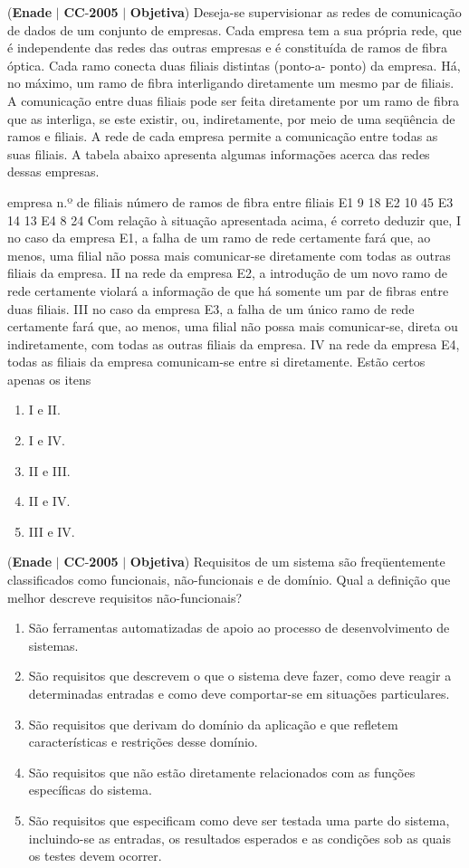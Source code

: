 \documentclass{exam}
\begin{document}
\begin{questions}
\question (\textbf{Enade} $|$ \textbf{CC}-\textbf{2005} $|$ \textbf{Objetiva})
Deseja-se supervisionar as redes de comunicação
de dados de um conjunto de empresas. Cada empresa
tem a sua própria rede, que é independente das redes
das outras empresas e é constituída de ramos de fibra
óptica. Cada ramo conecta duas filiais distintas (ponto-a-
ponto) da empresa. Há, no máximo, um ramo de fibra
interligando diretamente um mesmo par de filiais.
A comunicação entre duas filiais pode ser feita
diretamente por um ramo de fibra que as interliga, se
este existir, ou, indiretamente, por meio de uma
seqüência de ramos e filiais. A rede de cada empresa
permite a comunicação entre todas as suas filiais.
A tabela abaixo apresenta algumas informações acerca
das redes dessas empresas.

empresa n.º de filiais
número de ramos
de fibra entre filiais
E1 9 18
E2 10 45
E3 14 13
E4 8 24
Com relação à situação apresentada acima, é correto deduzir
que,
I no caso da empresa E1, a falha de um ramo de rede
certamente fará que, ao menos, uma filial não possa mais
comunicar-se diretamente com todas as outras filiais da
empresa.
II na rede da empresa E2, a introdução de um novo ramo de
rede certamente violará a informação de que há somente
um par de fibras entre duas filiais.
III no caso da empresa E3, a falha de um único ramo de rede
certamente fará que, ao menos, uma filial não possa mais
comunicar-se, direta ou indiretamente, com todas as outras
filiais da empresa.
IV na rede da empresa E4, todas as filiais da empresa
comunicam-se entre si diretamente.
Estão certos apenas os itens
	\begin{enumerate}[label=\alph*)]
		\item  I e II. 
		\item  I e IV. 
		\item  II e III.
		\item  II e IV.
		\item  III e IV.
	\end{enumerate}

\question (\textbf{Enade} $|$ \textbf{CC}-\textbf{2005} $|$ \textbf{Objetiva})
Requisitos de um sistema são freqüentemente classificados como
funcionais, não-funcionais e de domínio. Qual a definição que
melhor descreve requisitos não-funcionais?
	\begin{enumerate}[label=\alph*)]
		\item  São ferramentas automatizadas de apoio ao processo de
desenvolvimento de sistemas.
		\item  São requisitos que descrevem o que o sistema deve fazer, como
deve reagir a determinadas entradas e como deve comportar-se
em situações particulares.
		\item  São requisitos que derivam do domínio da aplicação e que
refletem características e restrições desse domínio.
		\item  São requisitos que não estão diretamente relacionados com as
funções específicas do sistema.
		\item  São requisitos que especificam como deve ser testada uma parte
do sistema, incluindo-se as entradas, os resultados esperados e as
condições sob as quais os testes devem ocorrer.
	\end{enumerate}


\end{questions}
\end{document}
